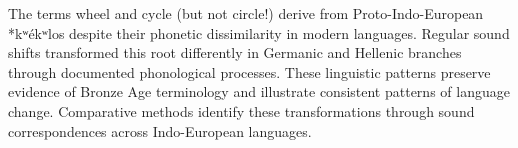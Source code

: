 The terms \QSOpen{}wheel\QSClose{} and \QSOpen{}cycle\QSClose{} (but not circle!) derive from Proto-Indo-European *kʷékʷlos despite their phonetic dissimilarity in modern languages. Regular sound shifts transformed this root differently in Germanic and Hellenic branches through documented phonological processes. These linguistic patterns preserve evidence of Bronze Age terminology and illustrate consistent patterns of language change. Comparative methods identify these transformations through sound correspondences across Indo-European languages.